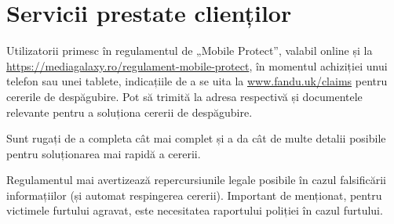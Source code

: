 \section{Servicii prestate clienților}
	Utilizatorii primesc în regulamentul de „Mobile Protect”, valabil online și la \url{https://mediagalaxy.ro/regulament-mobile-protect}\cite{media_galaxy}, în momentul achiziției unui telefon sau unei tablete, indicațiile de a se uita la \url{www.fandu.uk/claims} pentru cererile de despăgubire. Pot să trimită la adresa respectivă și documentele relevante pentru a soluționa cererii de despăgubire.

	Sunt rugați de a completa cât mai complet și a da cât de multe detalii posibile pentru soluționarea mai rapidă a cererii.

	Regulamentul mai avertizează repercursiunile legale posibile în cazul falsificării informațiilor (și automat respingerea cererii). Important de menționat, pentru victimele furtului agravat, este necesitatea raportului poliției în cazul furtului. 